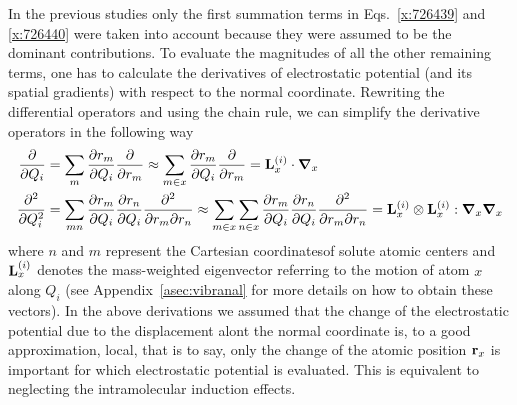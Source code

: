 \documentclass[a4paper,titlepage,twoside,fleqn,12pt]{book}
\newcommand{\BM}[1]{\bm{#1}}
\newcommand{\fderiv}[2]{\ensuremath{
\frac{\partial #1}{\partial #2}}}
\newcommand{\sderiv}[2]{\ensuremath{
\frac{\partial^2 #1}{\partial #2^2}
}}
\newcommand{\sderivd}[3]{\ensuremath{
\frac{\partial^2 #1}{\partial #2 \partial #3}
}}
\begin{document}
\begin{refsection}
In the previous studies only the first summation terms in 
Eqs.~\eqref{x:726439} and \eqref{x:726440} were taken into account because 
they were assumed to be the dominant contributions. To evaluate the
magnitudes of all the other remaining terms, one has to calculate
the derivatives of electrostatic potential (and its spatial gradients)
with respect to the normal coordinate. Rewriting the differential 
operators and using the chain rule, we can simplify the
derivative operators in the following way
%
\begin{subequations}  \label{e:deriv-operators}
\begin{align}
\fderiv{}{Q_i} &= \sum_m \fderiv{r_m}{Q_i}\fderiv{}{r_m} 
     \approx \sum_{m\in x} \fderiv{r_m}{Q_i}\fderiv{}{r_m} 
     = {\bf L}_x^{(i)} \cdot {\BM \nabla}_x      \label{e:deriv-operators-1} \\
\sderiv{}{Q_i} &= \sum_{mn} \fderiv{r_m}{Q_i}\fderiv{r_n}{Q_i}\sderivd{}{r_m}{r_n} 
     \approx \sum_{m\in x}\sum_{n\in x} \fderiv{r_m}{Q_i}\fderiv{r_n}{Q_i}\sderivd{}{r_m}{r_n} 
     = {\bf L}_x^{(i)} \otimes {\bf L}_x^{(i)} : {\BM \nabla}_x{\BM \nabla}_x  \label{e:deriv-operators-2}
\end{align}
\end{subequations}
%
where $n$ and $m$ represent the Cartesian coordinatesof solute
atomic centers and ${\bf L}_x^{(i)}$ denotes the mass\hyp{}weighted
eigenvector referring to the motion of atom $x$ along $Q_i$
(see Appendix~\ref{asec:vibranal} for more details on how to obtain these vectors).
In the above derivations we assumed that the change of the electrostatic
potential due to the displacement alont the normal coordinate is, 
to a good approximation, local, that is to say, only the change of the
atomic position ${\bf r}_x$ is important for which electrostatic potential 
is evaluated. This is equivalent to neglecting the intramolecular induction
effects.


\end{refsection}
\end{document}
